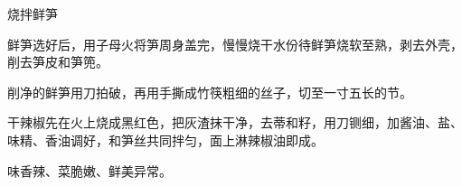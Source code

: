%
%
%
%
%
%
%
\begin{recipe}{烧拌鲜笋}

\ingredients


\preparation

\step 鲜笋选好后，用子母火将笋周身盖完，慢慢烧干水份待鲜笋烧软至熟，剥去外壳，
削去笋皮和笋篼。

\step 削净的鲜笋用刀拍破，再用手撕成竹筷粗细的丝子，切至一寸五长的节。

\step 干辣椒先在火上烧成黑红色，把灰渣抹干净，去蒂和籽，用刀铡细，加酱油、盐、
味精、香油调好，和笋丝共同拌匀，面上淋辣椒油即成。

\features

味香辣、菜脆嫩、鲜美异常。

\end{recipe}

